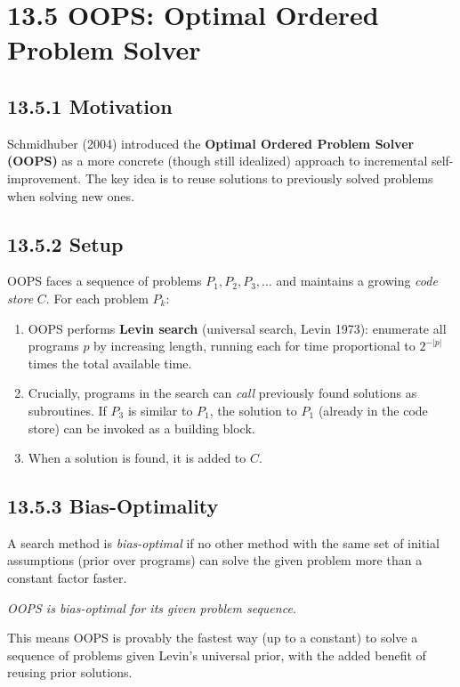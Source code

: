 \section{13.5 OOPS: Optimal Ordered Problem Solver}

\subsection{13.5.1 Motivation}

Schmidhuber (2004) introduced the \textbf{Optimal Ordered Problem Solver (OOPS)} as a more concrete (though still idealized) approach to incremental self-improvement. The key idea is to reuse solutions to previously solved problems when solving new ones.

\subsection{13.5.2 Setup}

OOPS faces a sequence of problems $P_1, P_2, P_3, \ldots$ and maintains a growing \textit{code store} $C$. For each problem $P_k$:

\begin{enumerate}
  \item OOPS performs \textbf{Levin search} (universal search, Levin 1973): enumerate all programs $p$ by increasing length, running each for time proportional to $2^{-|p|}$ times the total available time.
  \item Crucially, programs in the search can \textit{call} previously found solutions as subroutines. If $P_3$ is similar to $P_1$, the solution to $P_1$ (already in the code store) can be invoked as a building block.
  \item When a solution is found, it is added to $C$.
\end{enumerate}

\subsection{13.5.3 Bias-Optimality}

\begin{definition}
A search method is \textit{bias-optimal} if no other method with the same set of initial assumptions (prior over programs) can solve the given problem more than a constant factor faster.
\end{definition}

\begin{theorem}[Schmidhuber 2004]
\textit{OOPS is bias-optimal for its given problem sequence.}

This means OOPS is provably the fastest way (up to a constant) to solve a sequence of problems given Levin's universal prior, with the added benefit of reusing prior solutions.
\end{theorem}

